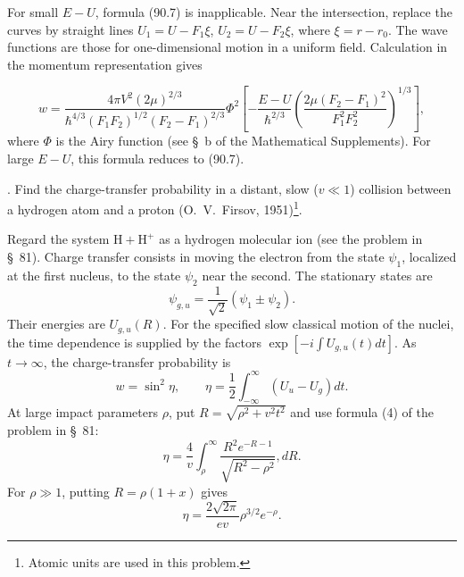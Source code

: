 \SolutionHeading For small $E-U$, formula (90.7) is inapplicable. Near the intersection, replace the curves by straight lines $U_1=U-F_1\xi$, $U_2=U-F_2\xi$, where $\xi=r-r_0$. The wave functions are those for one-dimensional motion in a uniform field. Calculation in the momentum representation gives

\begin{equation}
w=\frac{4\pi V^2(2\mu)^{2/3}}{\hbar^{4/3}(F_1F_2)^{1/2}(F_2-F_1)^{2/3}}
\Phi^2\!\left[-\frac{E-U}{\hbar^{2/3}}\left(\frac{2\mu(F_2-F_1)^2}{F_1^2F_2^2}\right)^{1/3}\right],
\tag{90.22}
\end{equation}
where $\Phi$ is the Airy function (see \S~b of the Mathematical Supplements). For large $E-U$, this formula reduces to (90.7).

. Find the charge-transfer probability in a distant, slow ($v\ll1$) collision between a hydrogen atom and a proton (O.~V.~Firsov, 1951)\footnote{Atomic units are used in this problem.}.

\SolutionHeading Regard the system $\mathrm H+\mathrm H^+$ as a hydrogen molecular ion (see the problem in \S~81). Charge transfer consists in moving the electron from the state $\psi_1$, localized at the first nucleus, to the state $\psi_2$ near the second. The stationary states are
\[
\psi_{g,u}=\frac1{\sqrt2}(\psi_1\pm\psi_2).
\]
Their energies are $U_{g,u}(R)$. For the specified slow classical motion of the nuclei, the time dependence is supplied by the factors $\exp[-i\int U_{g,u}(t)dt]$. As $t\to\infty$, the charge-transfer probability is
\[
w=\sin^2\eta,\qquad \eta=\frac12\int_{-\infty}^{\infty}(U_u-U_g)dt.
\]
At large impact parameters $\rho$, put $R=\sqrt{\rho^2+v^2t^2}$ and use formula (4) of the problem in \S~81:
\[
\eta=\frac4v\int_\rho^\infty\frac{R^2e^{-R-1}}{\sqrt{R^2-\rho^2}},dR.
\]
For $\rho\gg1$, putting $R=\rho(1+x)$ gives
\[
\eta=\frac{2\sqrt{2\pi}}{ev}\rho^{3/2}e^{-\rho}.
\]
